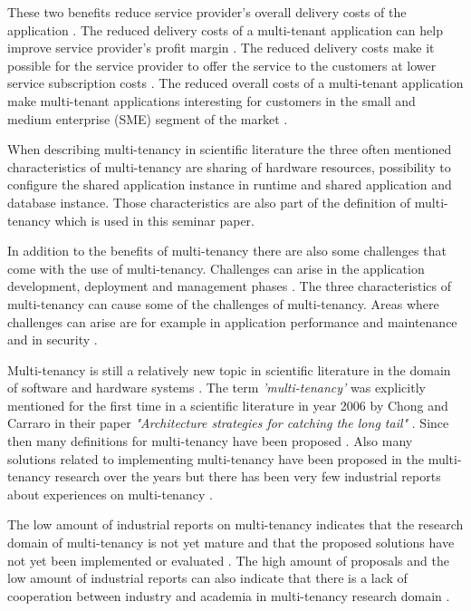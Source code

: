 \documentclass[conference]{sasmoota2017}
\begin{document}
These two benefits reduce service provider's overall delivery costs of the application \cite{Bezemer:2010:MaintenanceDream}. The reduced delivery costs of a multi-tenant application can help improve service provider's profit margin \cite{Guo:2007:FrameworkForNative}. The reduced delivery costs make it possible for the service provider to offer the service to the customers at lower service subscription costs \cite{Guo:2007:FrameworkForNative}. The reduced overall costs of a multi-tenant application make multi-tenant applications interesting for customers in the small and medium enterprise (SME) segment of the market \cite{Bezemer:2010:MaintenanceDream}.

When describing multi-tenancy in scientific literature the three often mentioned characteristics of multi-tenancy are sharing of hardware resources, possibility to configure the shared application instance in runtime and shared application and database instance. Those characteristics are also part of the definition of multi-tenancy which is used in this seminar paper. 

In addition to the benefits of multi-tenancy there are also some challenges that come with the use of multi-tenancy. Challenges can arise in the application development, deployment and management phases \cite{Guo:2007:FrameworkForNative}. The three characteristics of multi-tenancy can cause some of the challenges of multi-tenancy. Areas where challenges can arise are for example in application performance and maintenance and in security \cite{Bezemer:2010:MaintenanceDream}. 

Multi-tenancy is still a relatively new topic in scientific literature in the domain of software and hardware systems \cite{Kabbedijk2015:Defining}. The term \textit{'multi-tenancy'} was explicitly mentioned for the first time in a scientific literature in year 2006 \cite{Kabbedijk2015:Defining} by Chong and Carraro in their paper \textit{"Architecture strategies for catching the long tail"} \cite{Carraro:2006:ArchitectureLongTail}. Since then many definitions for multi-tenancy have been proposed \cite{Kabbedijk2015:Defining}. Also many solutions related to implementing multi-tenancy have been proposed in the multi-tenancy research over the years but there has been very few industrial reports about experiences on multi-tenancy \cite{Kabbedijk2015:Defining}. 

The low amount of industrial reports on multi-tenancy indicates that the research domain of multi-tenancy is not yet mature and that the proposed solutions have not yet been implemented or evaluated \cite{Kabbedijk2015:Defining}. The high amount of proposals and the low amount of industrial reports can also indicate that there is a lack of cooperation between industry and academia in multi-tenancy research domain \cite{Kabbedijk2015:Defining}.
\end{document}

